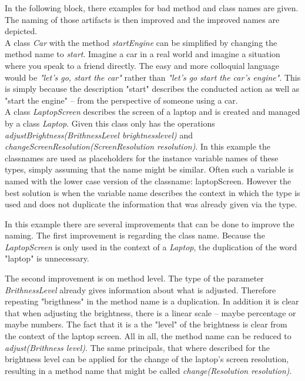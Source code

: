In the following block, there examples for bad method and class names are given. The naming of those artifacts is then improved and the improved names are depicted. 
\\

A class \textit{Car} with the method \textit{startEngine} can be simplified by changing the method name to \textit{start}. Imagine a car in a real world and imagine a situation where you speak to a friend directly. The easy and more colloquial language would be \textit{"let's go, start the car"} rather than \textit{"let's go start the car's engine"}. This is simply because the description "start" describes the conducted action as well as "start the engine" -- from the perspective of someone using a car.\\

A class \textit{LaptopScreen} describes the screen of a laptop and is created and managed by a class \textit{Laptop}. Given this class only has the operations \textit{adjustBrightness(BrithnessLevel brightnesslevel)} and \textit{changeScreenResolution(ScreenResolution resolution)}. In this example the classnames are used as placeholders for the instance variable names of these types, simply assuming that the name might be similar. Often such a variable is named with the lower case version of the classname: laptopScreen. However the best solution is when the variable name describes the context in which the type is used and does not duplicate the information that was already given via the type.  

In this example there are several improvements that can be done to improve the naming. The first improvement is regarding the class name. Because the \textit{LaptopScreen} is only used in the context of a \textit{Laptop}, the duplication of the word "laptop" is unnecessary.

The second improvement is on method level. The type of the parameter \textit{BrithnessLevel} already gives information about what is adjusted. Therefore repeating "brigthness" in the method name is a duplication. In addition it is clear that when adjusting the brightness, there is a linear scale -- maybe percentage or maybe numbers. The fact that it is a the "level" of the brightness is clear from the context of the laptop screen. All in all, the method name can be reduced to \textit{adjust(Brithness level)}. The same principals, that where described for the brightness level can be applied for the change of the laptop's screen resolution, resulting in a method name that might be called \textit{change(Resolution resolution)}.

